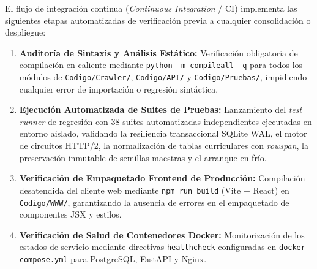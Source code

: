 El flujo de integración continua (\emph{Continuous Integration} / CI) implementa las siguientes etapas automatizadas de verificación previa a cualquier consolidación o despliegue:
\begin{enumerate}
    \item \textbf{Auditoría de Sintaxis y Análisis Estático:} Verificación obligatoria de compilación en caliente mediante \texttt{python -m compileall -q} para todos los módulos de \texttt{Codigo/Crawler/}, \texttt{Codigo/API/} y \texttt{Codigo/Pruebas/}, impidiendo cualquier error de importación o regresión sintáctica.
    \item \textbf{Ejecución Automatizada de Suites de Pruebas:} Lanzamiento del \emph{test runner} de regresión con 38 suites automatizadas independientes ejecutadas en entorno aislado, validando la resiliencia transaccional SQLite WAL, el motor de circuitos HTTP/2, la normalización de tablas curriculares con \emph{rowspan}, la preservación inmutable de semillas maestras y el arranque en frío.
    \item \textbf{Verificación de Empaquetado Frontend de Producción:} Compilación desatendida del cliente web mediante \texttt{npm run build} (Vite + React) en \texttt{Codigo/WWW/}, garantizando la ausencia de errores en el empaquetado de componentes JSX y estilos.
    \item \textbf{Verificación de Salud de Contenedores Docker:} Monitorización de los estados de servicio mediante directivas \texttt{healthcheck} configuradas en \texttt{docker-compose.yml} para PostgreSQL, FastAPI y Nginx.
\end{enumerate}
